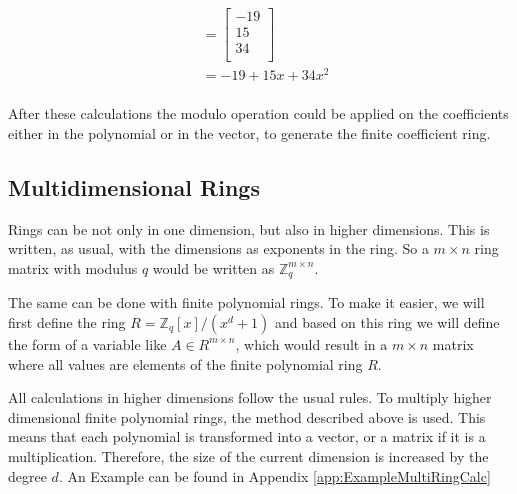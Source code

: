\begin{align*}
{  }                                                                           \\
                 & = \begin{bmatrix}
                       -19 \\
                       15  \\
                       34  \\
                     \end{bmatrix}                                           \\
                 & = -19+15x+34x^2                                            \\                     
\end{align*}

After these calculations the modulo operation could be applied on the coefficients either in the polynomial or in the vector, to generate the finite coefficient ring.

\subsection*{Multidimensional Rings}

Rings can be not only in one dimension, but also in higher dimensions. This is written, as usual, with the dimensions as exponents in the ring. So a $m \times n$ ring matrix with modulus $q$ would be written as $\mathbb{Z}^{m\times n}_q$.

The same can be done with finite polynomial rings. To make it easier, we will first define the ring $R = \mathbb{Z}_q[x]/(x^d+1)$ and based on this ring we will define the form of a variable like $A \in R^{m\times n}$, which would result in a $m \times n$ matrix where all values are elements of the finite polynomial ring $R$.

All calculations in higher dimensions follow the usual rules. To multiply higher dimensional finite polynomial rings, the method described above is used. This means that each polynomial is transformed into a vector, or a matrix if it is a multiplication. Therefore, the size of the current dimension is increased by the degree $d$. An Example can be found in Appendix \ref{app:ExampleMultiRingCalc}